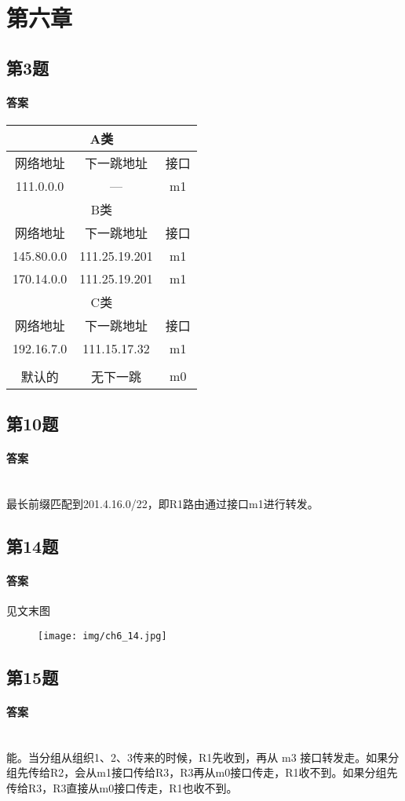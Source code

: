 \documentclass[UTF8]{article}
\begin{document}
\section{第六章}
\subsection{第3题}
\paragraph{答案}
\begin{tabular}{|c|c|c|}
    \hline \multicolumn{3}{|c|}{A类}\\
    \hline 网络地址&下一跳地址&接口\\
    \hline 111.0.0.0&---&m1\\
    \hline \multicolumn{3}{|c|}{B类}\\
    \hline 网络地址&下一跳地址&接口\\
    \hline 145.80.0.0&111.25.19.201&m1\\
    \hline 170.14.0.0&111.25.19.201&m1\\
    \hline \multicolumn{3}{|c|}{C类}\\
    \hline 网络地址&下一跳地址&接口\\
    \hline 192.16.7.0 &111.15.17.32&m1\\
    \hline \multicolumn{3}{|c|}{}\\
    \hline 默认的 &无下一跳&m0\\
    \hline
\end{tabular}
\subsection{第10题}
\paragraph{答案}
~\\
最长前缀匹配到201.4.16.0/22，即R1路由通过接口m1进行转发。
\subsection{第14题}
\paragraph{答案}
见文末图
\begin{figure}[h]
    \begin{center}
        \texttt{[image: img/ch6\_14.jpg]}
    \end{center}
\end{figure}
\subsection{第15题}
\paragraph{答案}
~\\
能。当分组从组织1、2、3传来的时候，R1先收到，再从 m3 接口转发走。如果分组先传给R2，会从m1接口传给R3，R3再从m0接口传走，R1收不到。如果分组先传给R3，R3直接从m0接口传走，R1也收不到。
\end{document}
